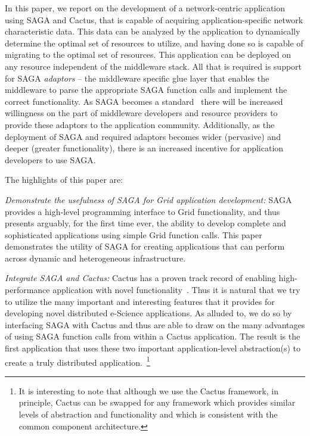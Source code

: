\documentclass[conference,final]{IEEEtran}
\newcommand{\jhanote}[1]{ {\textcolor{red} { ***Jha: #1 }}}
\begin{document}

In this paper, we report on the development of a network-centric
application using SAGA and Cactus, that is capable of acquiring
application-specific network characteristic data. This data can be
analyzed by the application to dynamically determine the optimal set
of resources to utilize, and having done so is capable of migrating to
the optimal set of resources.  This application can be deployed on any
resource independent of the middleware stack. All that is required is
support for SAGA {\it adaptors} -- the middleware specific glue layer
that enables the middleware to parse the appropriate SAGA function
calls and implement the correct functionality.  As SAGA becomes a
standard~\cite{saga-uc, saga-req, saga-core} there will be increased
willingness on the part of middleware developers and resource
providers to provide these adaptors to the application community.
Additionally, as the deployment of SAGA and required adaptors becomes
wider (pervasive) and deeper (greater functionality), there is an
increased incentive for application developers to use SAGA.


The highlights of this paper are:

{\it Demonstrate the usefulness of SAGA for Grid application
  development:} SAGA provides a high-level programming interface to
Grid functionality, and thus presents arguably, for the first time
ever, the ability to develop complete and sophisticated applications
using simple Grid function calls.  This paper demonstrates the utility
of SAGA for creating applications that can perform across dynamic and
heterogeneous infrastructure.

{\it Integrate SAGA and Cactus:} Cactus has a proven track
record of enabling high-performance application with novel
functionality~\cite{Cactus_GordonBell, Sidney_Fernbach}.  Thus it is
natural that we try to utilize the many important and interesting
features that it provides for developing novel distributed e-Science
applications. As alluded to, we do so by interfacing SAGA with Cactus
and thus are able to draw on the many advantages of using SAGA
function calls from within a Cactus application.  The result is the
first application that uses these two important application-level
abstraction(s) to create a truly distributed application.~\footnote{It
  is interesting to note that although we use the Cactus framework, in
  principle, Cactus can be swapped for any framework which provides
  similar levels of abstraction and functionality and which is
  consistent with the common component architecture.}
\end{document}
